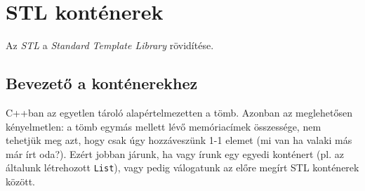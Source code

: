 \documentclass[a4paper,11.5pt,table]{article}
\begin{document}
	\section{STL konténerek}
	
	Az \textit{STL} a \textit{Standard Template Library} rövidítése.
	\subsection{Bevezető a konténerekhez}
	C++ban az egyetlen tároló alapértelmezetten a tömb. Azonban az meglehetősen kényelmetlen: a tömb egymás mellett lévő memóriacímek összessége, nem tehetjük meg azt, hogy csak úgy hozzáveszünk 1-1 elemet (mi van ha valaki más már írt oda?). Ezért jobban járunk, ha vagy írunk egy egyedi konténert (pl. az általunk létrehozott \texttt{List}), vagy pedig válogatunk az előre megírt STL konténerek között.
	
\end{document}
